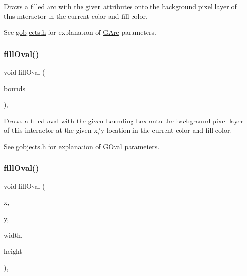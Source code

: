 Draws a filled arc with the given attributes onto the background pixel layer of this interactor in the current color and fill color. 

See \mbox{\hyperlink{gobjects_8h_source}{gobjects.\+h}} for explanation of \mbox{\hyperlink{classGArc}{G\+Arc}} parameters. \mbox{\label{classGDrawingSurface_a1ea6e48d59fb588797dba4deab1397e0}} 
\subsubsection{\texorpdfstring{fill\+Oval()}{fillOval()}\hspace{0.1cm}{\footnotesize\ttfamily [1/2]}}
{\footnotesize\ttfamily void fill\+Oval (\begin{DoxyParamCaption}\item[{const \mbox{\hyperlink{classGRectangle}{G\+Rectangle}} \&}]{bounds }\end{DoxyParamCaption})\hspace{0.3cm}{\ttfamily [virtual]}, {\ttfamily [inherited]}}



Draws a filled oval with the given bounding box onto the background pixel layer of this interactor at the given x/y location in the current color and fill color. 

See \mbox{\hyperlink{gobjects_8h_source}{gobjects.\+h}} for explanation of \mbox{\hyperlink{classGOval}{G\+Oval}} parameters. \mbox{\label{classGDrawingSurface_a28c700c82f31cd328a4629273420ee61}} 
\subsubsection{\texorpdfstring{fill\+Oval()}{fillOval()}\hspace{0.1cm}{\footnotesize\ttfamily [2/2]}}
{\footnotesize\ttfamily void fill\+Oval (\begin{DoxyParamCaption}\item[{double}]{x,  }\item[{double}]{y,  }\item[{double}]{width,  }\item[{double}]{height }\end{DoxyParamCaption})\hspace{0.3cm}{\ttfamily [virtual]}, {\ttfamily [inherited]}}



